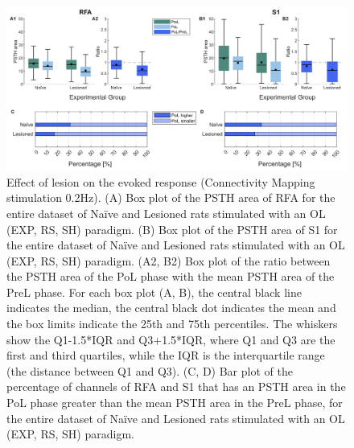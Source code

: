 \begin{figure}[ht!]
    \begin{center}
    \includegraphics[width=\linewidth]{Figure/Ratio PSTH area separate/ratio PoL-PreL PSTH area 0.2Hz.jpg}
    \end{center}
    \caption{Effect of lesion on the evoked response (Connectivity Mapping stimulation 0.2Hz). (A) Box plot of the PSTH area of RFA for the entire dataset of Naïve and Lesioned rats stimulated with an OL (EXP, RS, SH) paradigm. (B) Box plot of the PSTH area of S1 for the entire dataset of Naïve and Lesioned rats stimulated with an OL (EXP, RS, SH) paradigm. (A2, B2) Box plot of the ratio between the PSTH area of the PoL phase with the mean PSTH area of the PreL phase. For each box plot (A, B), the central black line indicates the median, the central black dot indicates the mean and the box limits indicate the 25th and 75th percentiles. The whiskers show the Q1-1.5*IQR and Q3+1.5*IQR, where Q1 and Q3 are the first and third quartiles, while the IQR is the interquartile range (the distance between Q1 and Q3). (C, D) Bar plot of the percentage of channels of RFA and S1 that has an PSTH area in the PoL phase greater than the mean PSTH area in the PreL phase, for the entire dataset of Naïve and Lesioned rats stimulated with an OL (EXP, RS, SH) paradigm.}
    \label{fig:ratio PoL-PreL PSTH area 0.2Hz}
\end{figure}


